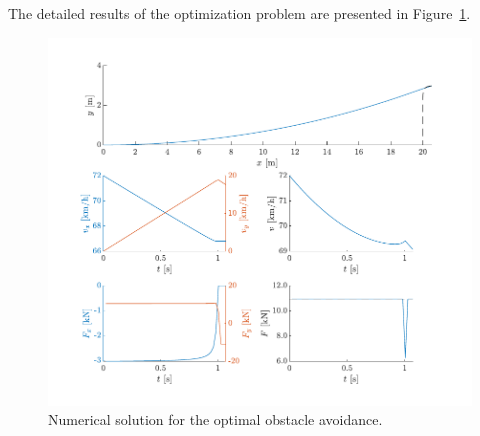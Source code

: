 The detailed results of the optimization problem are presented in Figure~\ref{fig:num_sol_opt_avoid_PM_res_pic}.
\begin{figure}[h!]
    \centering
    \includegraphics{figures/prob4_opt_avoid_path.pdf}
    \caption{Numerical solution for the optimal obstacle avoidance.}
    \label{fig:num_sol_opt_avoid_PM_res_pic}
\end{figure}
